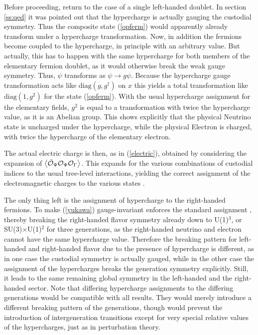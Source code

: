 \documentclass[final,12pt]{article}
\newcommand*{\pref}[1]{(\ref{#1})}
\newcommand*{\diag}{\mathrm{diag}}
\newcommand*{\1}{1\!\!\!\bot}
\newcommand*{\la}{\left\langle}
\newcommand*{\ra}{\right\rangle}
\newcommand*{\op}{{\cal O}}
\begin{document}
Before proceeding, return to the case of a single left-handed doublet. In section \ref{ss:qed} it was pointed out that the hypercharge is actually gauging the custodial symmetry. Thus the composite state \pref{opferm} would apparently already transform under a hypercharge transformation. Now, in addition the fermions become coupled to the hypercharge, in principle with an arbitrary value. But actually, this has to happen with the same hypercharge for both members of the elementary fermion doublet, as it would otherwise break the weak gauge symmetry. Thus, $\psi$ transforms as $\psi\to g\psi$. Because the hypercharge gauge transformation acts like $\diag(g,g^\dagger)$ on $x$ this yields a total transformation like $\diag(1,g^2)$ for the state \pref{opferm}. With the usual hypercharge assignment for the elementary fields, $g^2$ is equal to a transformation with twice the hypercharge value, as it is an Abelian group. This shows explicitly that the physical Neutrino state is uncharged under the hypercharge, while the physical Electron is charged, with twice the hypercharge of the elementary electron.

The actual electric charge is then, as in \pref{electric}, obtained by considering the expansion of $\la\bar{\op}_\Psi\op_\Psi\op_\Gamma\ra$. This expands for the various combinations of custodial indices to the usual tree-level interactions, yielding the correct assignment of the electromagnetic charges to the various states \cite{Bohm:2001yx}.

The only thing left is the assignment of hypercharge to the right-handed fermions. To make \pref{yukawa} gauge-invariant enforces the standard assignment \cite{Bohm:2001yx}, thereby breaking the right-handed flavor symmetry already down to U(1)$^3$, or SU(3)$\times$U(1)$^2$ for three generations, as the right-handed neutrino and electron cannot have the same hypercharge value. Therefore the breaking pattern for left-handed and right-handed flavor due to the presence of hypercharge is different, as in one case the custodial symmetry is actually gauged, while in the other case the assignment of the hypercharges breaks the generation symmetry explicitly. Still, it leads to the same remaining global symmetry in the left-handed and the right-handed sector. Note that differing hypercharge assignments to the differing generations would be compatible with all results. They would merely introduce a different breaking pattern of the generations, though would prevent the introduction of intergeneration transitions except for very special relative values of the hypercharges, just as in perturbation theory.
\end{document}
